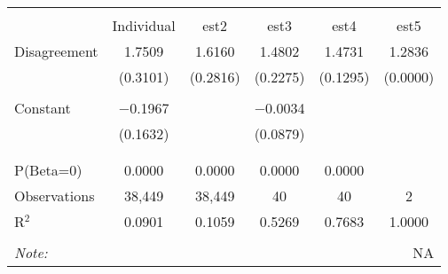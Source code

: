  \begin{table}[!htbp] \centering    \caption{}    \label{}  \begin{tabular}{@{\extracolsep{5pt}}lccccc}  \\[-1.8ex]\hline  \hline \\[-1.8ex]   & Individual & est2 & est3 & est4 & est5 \\   Disagreement & 1.7509 & 1.6160 & 1.4802 & 1.4731 & 1.2836 \\    & (0.3101) & (0.2816) & (0.2275) & (0.1295) & (0.0000) \\    & & & & & \\   Constant & $-$0.1967 &  & $-$0.0034 &  &  \\    & (0.1632) &  & (0.0879) &  &  \\    & & & & & \\  \hline \\[-1.8ex]  P(Beta=0) & 0.0000 & 0.0000 & 0.0000 & 0.0000 &  \\  Observations & 38,449 & 38,449 & 40 & 40 & 2 \\  R$^{2}$ & 0.0901 & 0.1059 & 0.5269 & 0.7683 & 1.0000 \\  \hline  \hline \\[-1.8ex]  \textit{Note:}  & \multicolumn{5}{r}{NA} \\  \end{tabular}  \end{table} 